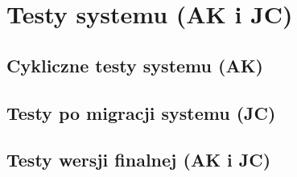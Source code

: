 \chapter{Testy systemu (AK i JC)}
\label{cha:tests}

\section{Cykliczne testy systemu (AK)}

\section{Testy po migracji systemu (JC)}

\section{Testy wersji finalnej (AK i JC)}
